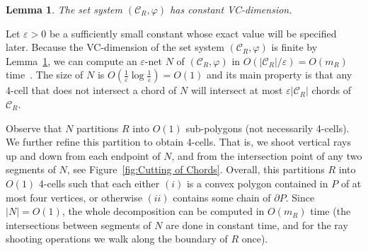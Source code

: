 \documentclass[a4paper]{article}
\newtheorem{lemma}[theorem]{Lemma}
\newcommand{\m}{\ensuremath{m_{\scriptscriptstyle R}}}
\newcommand{\tcell}{4-cell\xspace}
\newcommand{\tcells}{4-cells\xspace}
\newcommand{\C}{\ensuremath{{\mathcal C_R}}}
\begin{document}
\begin{lemma}\label{lemma:bounded VC}
The set system $(\C, \varphi)$ has constant VC-dimension.
\end{lemma}

Let $\varepsilon >0$ be a sufficiently small constant whose exact value will be specified later.
Because the VC-dimension of the set system $(\C, \varphi)$ is finite by Lemma~\ref{lemma:bounded VC}, we can compute an $\varepsilon$-net $N$ of $(\C, \varphi)$ in $O(|\C|/\varepsilon) = O(\m)$ time~\cite{ConstructionEpsilonNets}. 
The size of $N$ is $O(\frac{1}{\varepsilon} \log \frac{1}{\varepsilon}) = O(1)$ and its main property is that any \tcell that does not intersect a chord of $N$ will intersect at most $\varepsilon |\C|$ chords of $\C$. 

Observe that $N$ partitions $R$ into $O(1)$ sub-polygons (not necessarily \tcells). We further refine this partition to obtain \tcells. That is, we shoot vertical rays up and down from each endpoint of $N$, and from the intersection point of  any two segments of $N$, see Figure~\ref{fig:Cutting of Chords}. Overall, this partitions $R$ into $O(1)$ \tcells such that each  either $(i)$  is a convex polygon contained in $P$ of at most four vertices, or otherwise $(ii)$ contains some chain of $\partial P$. 
Since $|N| = O(1)$, the whole decomposition can be computed in $O(\m)$ time (the intersections between segments of $N$ are done in constant time, and for the ray shooting operations we walk along the boundary of $R$ once).
\end{document}
